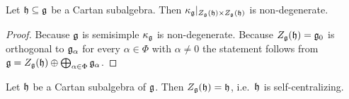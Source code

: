 \begin{cor}\label{cor: restriction of killing form to centralizer is non-degenerate}
 Let $\mathfrak{h} \subseteq \mathfrak{g}$ be a Cartan subalgebra. Then $\kappa_{\mathfrak{g}}|_{Z_{\mathfrak{g}}(\mathfrak{h}) \times Z_{\mathfrak{g}}(\mathfrak{h})}$ is non-degenerate.
\end{cor}
\begin{proof}
 Because $\mathfrak{g}$ is semisimple $\kappa_{\mathfrak{g}}$ is non-degenerate. Because $Z_{\mathfrak{g}}(\mathfrak{h}) = \mathfrak{g}_0$ is orthogonal to $\mathfrak{g}_\alpha$ for every $\alpha \in \Phi$ with $\alpha \neq 0$ the statement follows from $\mathfrak{g} = Z_{\mathfrak{g}}(\mathfrak{h}) \oplus \bigoplus_{\alpha \in \Phi} \mathfrak{g}_\alpha$.
\end{proof}




\begin{prop}\label{prop: CSA are self-centralizing}
 Let $\mathfrak{h}$ be a Cartan subalgebra of $\mathfrak{g}$. Then $Z_{\mathfrak{g}}(\mathfrak{h}) = \mathfrak{h}$, i.e.\ $\mathfrak{h}$ is self-centralizing.
\end{prop}
